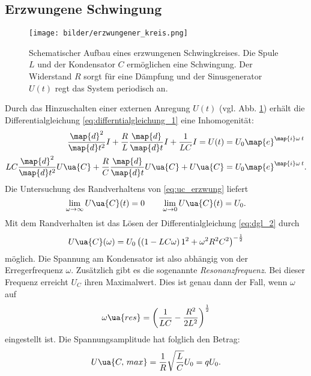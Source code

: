 \subsection{Erzwungene Schwingung}
\begin{figure}
  \centering
  \texttt{[image: bilder/erzwungener\_kreis.png]}
  \caption{Schematischer Aufbau eines erzwungenen Schwingkreises.
  Die Spule $L$ und der Kondensator $C$ ermöglichen eine Schwingung.
  Der Widerstand $R$ sorgt für eine Dämpfung und der Sinusgenerator $U(t)$ regt das
  System periodisch an\cite{anleitung354}. }
  \label{fig:erzwungen}
\end{figure}
Durch das Hinzuschalten einer externen Anregung $U(t)$ (vgl. Abb. \ref{fig:erzwungen}) %
erhält die Differentialgleichung \eqref{eq:differntialgleichung_1} eine %
Inhomogenität:
\begin{align}
  \frac{\map{d}^2}{\map{d}t^2}I+\frac{R}{L}\frac{\map{d}}{\map{d}t}I+\frac{1}{LC}I=U(t)&=U_0\map{e}^{\map{i}\omega\, t}\notag \\
  LC\frac{\map{d}^2}{\map{d}t^2}U\ua{C}+\frac{R}{C}\frac{\map{d}}{\map{d}t}U\ua{C}+U\ua{C}&=U_0\map{e}^{\map{i}\omega\, t}. \label{eq:dgl_2}
\end{align}
Die Untersuchung des Randverhaltens von \eqref{eq:uc_erzwung} liefert
\begin{equation*}
  \lim_{\omega \to \infty} U\ua{C}(t)=0 \qquad \lim_{\omega \to 0} U\ua{C}(t)=U_0.
\end{equation*}
Mit dem Randverhalten ist das Lösen der Differentialgleichung \eqref{eq:dgl_2} durch
\begin{equation}
  \label{eq:uc_erzwung}
  U\ua{C}(\omega)=U_0\left(\left(1-LC\omega\right)1^2+\omega^2R^2C^2\right)^{-\frac{1}{2}}
\end{equation}
möglich.
Die Spannung am Kondensator ist also abhängig von der Erregerfrequenz $\omega$.
Zusätzlich gibt es die sogenannte \emph{Resonanzfrequenz}.
Bei dieser Frequenz erreicht $U_C$ ihren Maximalwert. Dies ist genau dann der Fall, wenn
$\omega$ auf
\begin{equation*}
  \label{eq:resonanzfrequenz}
  \omega\ua{res}=\left(\frac{1}{LC}-\frac{R^2}{2L^2}\right)^{\frac{1}{2}}
\end{equation*}
eingestellt ist.
Die Spannungsamplitude hat folglich den Betrag:
\begin{equation}
  \label{eq:spann_ampli}
  U\ua{C,\, max}=\frac{1}{R}\sqrt{\frac{L}{C}}U_0=qU_0.
\end{equation}
